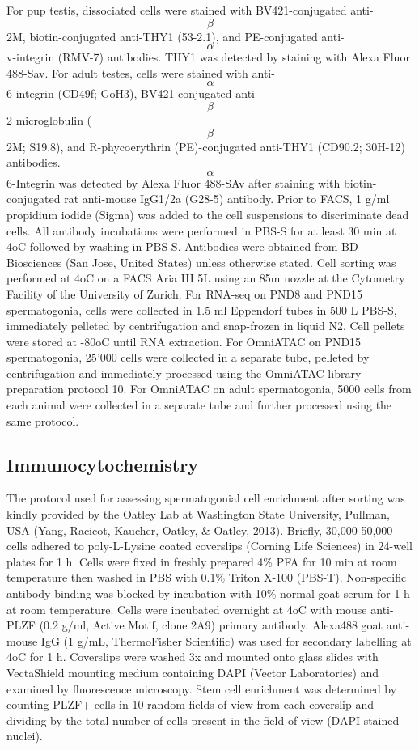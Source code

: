 \documentclass[12pt,twoside]{reedthesis}
\begin{document}
For pup testis, dissociated cells were stained with BV421-conjugated
anti-\[\beta\]2M, biotin-conjugated anti-THY1 (53-2.1), and
PE-conjugated anti-\[\alpha\]v-integrin (RMV-7) antibodies. THY1 was
detected by staining with Alexa Fluor 488-Sav. For adult testes, cells
were stained with anti-\[\alpha\]6-integrin (CD49f; GoH3),
BV421-conjugated anti-\[\beta\]2 microglobulin (\[\beta\]2M; S19.8), and
R-phycoerythrin (PE)-conjugated anti-THY1 (CD90.2; 30H-12) antibodies.
\[\alpha\]6-Integrin was detected by Alexa Fluor 488-SAv after staining
with biotin-conjugated rat anti-mouse IgG1/2a (G28-5) antibody. Prior to
FACS, 1 \textmu g/ml propidium iodide (Sigma) was added to the cell
suspensions to discriminate dead cells. All antibody incubations were
performed in PBS-S for at least 30 min at 4oC followed by washing in
PBS-S. Antibodies were obtained from BD Biosciences (San Jose, United
States) unless otherwise stated. Cell sorting was performed at 4oC on a
FACS Aria III 5L using an 85\textmu m nozzle at the Cytometry Facility
of the University of Zurich. For RNA-seq on PND8 and PND15
spermatogonia, cells were collected in 1.5 ml Eppendorf tubes in 500
\textmu L PBS-S, immediately pelleted by centrifugation and snap-frozen
in liquid N2. Cell pellets were stored at -80oC until RNA extraction.
For OmniATAC on PND15 spermatogonia, 25'000 cells were collected in a
separate tube, pelleted by centrifugation and immediately processed
using the OmniATAC library preparation protocol 10. For OmniATAC on
adult spermatogonia, 5000 cells from each animal were collected in a
separate tube and further processed using the same protocol.

\hypertarget{immunocytochemistry}{%
\subsection{Immunocytochemistry}\label{immunocytochemistry}}

The protocol used for assessing spermatogonial cell enrichment after
sorting was kindly provided by the Oatley Lab at Washington State
University, Pullman, USA (\protect\hyperlink{ref-yang2013}{Yang, Racicot, Kaucher, Oatley, \& Oatley, 2013}). Briefly, 30,000-50,000 cells
adhered to poly-L-Lysine coated coverslips (Corning Life Sciences) in
24-well plates for 1 h. Cells were fixed in freshly prepared 4\% PFA for
10 min at room temperature then washed in PBS with 0.1\% Triton X-100
(PBS-T). Non-specific antibody binding was blocked by incubation with
10\% normal goat serum for 1 h at room temperature. Cells were incubated
overnight at 4oC with mouse anti-PLZF (0.2 \textmu g/ml, Active Motif,
clone 2A9) primary antibody. Alexa488 goat anti-mouse IgG (1 \textmu
g/mL, ThermoFisher Scientific) was used for secondary labelling at 4oC
for 1 h. Coverslips were washed 3x and mounted onto glass slides with
VectaShield mounting medium containing DAPI (Vector Laboratories) and
examined by fluorescence microscopy. Stem cell enrichment was determined
by counting PLZF+ cells in 10 random fields of view from each coverslip
and dividing by the total number of cells present in the field of view
(DAPI-stained nuclei).
\end{document}
